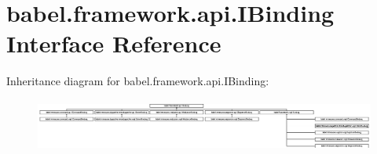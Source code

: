 \hypertarget{interfacebabel_1_1framework_1_1api_1_1_i_binding}{\section{babel.\-framework.\-api.\-I\-Binding Interface Reference}
\label{interfacebabel_1_1framework_1_1api_1_1_i_binding}
}
Inheritance diagram for babel.\-framework.\-api.\-I\-Binding\-:\begin{figure}[H]
\begin{center}
\leavevmode
\includegraphics[height=1.742222cm]{interfacebabel_1_1framework_1_1api_1_1_i_binding}
\end{center}
\end{figure}
